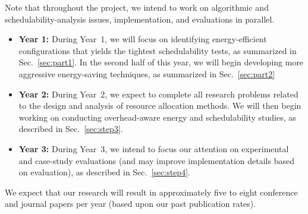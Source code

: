 Note that throughout the project, we intend to work on algorithmic and schedulability-analysis issues, implementation, and evaluations in parallel.

\begin{itemize}
\item \textbf{Year 1:} During Year~1, we will focus on identifying energy-efficient configurations that yields the tightest schedulability tests, as summarized in Sec.~\ref{sec:part1}. In the second half of this year, we will begin  developing more aggressive energy-saving techniques, as summarized in Sec.~\ref{sec:part2}
\item \textbf{Year 2:} During Year~2, we expect to complete all research problems related to the design and analysis of resource allocation methods. We will then begin working on conducting overhead-aware energy and schedulability studies, as described in Sec.~\ref{sec:step3}.
\item \textbf{Year 3:} During Year~3, we intend to focus our attention on experimental and case-study evaluations (and  may improve implementation details based on evaluation), as described in Sec.~\ref{sec:step4}.
\end{itemize}

We expect that our research will result in approximately five to eight conference and journal papers per year (based upon our past publication rates).
